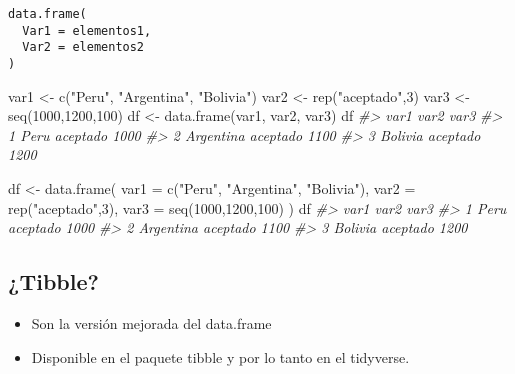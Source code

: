 \documentclass[
]{book}
\newenvironment{Shaded}{\begin{snugshade}}{\end{snugshade}}
\newcommand{\AttributeTok}[1]{\textcolor[rgb]{0.77,0.63,0.00}{#1}}
\newcommand{\CommentTok}[1]{\textcolor[rgb]{0.56,0.35,0.01}{\textit{#1}}}
\newcommand{\DecValTok}[1]{\textcolor[rgb]{0.00,0.00,0.81}{#1}}
\newcommand{\FunctionTok}[1]{\textcolor[rgb]{0.00,0.00,0.00}{#1}}
\newcommand{\NormalTok}[1]{#1}
\newcommand{\OtherTok}[1]{\textcolor[rgb]{0.56,0.35,0.01}{#1}}
\newcommand{\StringTok}[1]{\textcolor[rgb]{0.31,0.60,0.02}{#1}}
\providecommand{\tightlist}{%
  \setlength{\itemsep}{0pt}\setlength{\parskip}{0pt}}
\begin{document}
\begin{verbatim}
data.frame(
  Var1 = elementos1,
  Var2 = elementos2
)
\end{verbatim}

\begin{Shaded}
\begin{Highlighting}[]
\NormalTok{var1 }\OtherTok{\textless{}{-}} \FunctionTok{c}\NormalTok{(}\StringTok{"Peru"}\NormalTok{, }\StringTok{"Argentina"}\NormalTok{, }\StringTok{"Bolivia"}\NormalTok{)}
\NormalTok{var2 }\OtherTok{\textless{}{-}} \FunctionTok{rep}\NormalTok{(}\StringTok{"aceptado"}\NormalTok{,}\DecValTok{3}\NormalTok{)}
\NormalTok{var3 }\OtherTok{\textless{}{-}} \FunctionTok{seq}\NormalTok{(}\DecValTok{1000}\NormalTok{,}\DecValTok{1200}\NormalTok{,}\DecValTok{100}\NormalTok{)}
\NormalTok{df }\OtherTok{\textless{}{-}} \FunctionTok{data.frame}\NormalTok{(var1, var2, var3)}
\NormalTok{df}
\CommentTok{\#\textgreater{}        var1     var2 var3}
\CommentTok{\#\textgreater{} 1      Peru aceptado 1000}
\CommentTok{\#\textgreater{} 2 Argentina aceptado 1100}
\CommentTok{\#\textgreater{} 3   Bolivia aceptado 1200}
\end{Highlighting}
\end{Shaded}

\begin{Shaded}
\begin{Highlighting}[]
\NormalTok{df }\OtherTok{\textless{}{-}} \FunctionTok{data.frame}\NormalTok{(}
  \AttributeTok{var1 =} \FunctionTok{c}\NormalTok{(}\StringTok{"Peru"}\NormalTok{, }\StringTok{"Argentina"}\NormalTok{, }\StringTok{"Bolivia"}\NormalTok{),}
  \AttributeTok{var2 =} \FunctionTok{rep}\NormalTok{(}\StringTok{"aceptado"}\NormalTok{,}\DecValTok{3}\NormalTok{),}
  \AttributeTok{var3 =} \FunctionTok{seq}\NormalTok{(}\DecValTok{1000}\NormalTok{,}\DecValTok{1200}\NormalTok{,}\DecValTok{100}\NormalTok{)}
\NormalTok{)}
\NormalTok{df}
\CommentTok{\#\textgreater{}        var1     var2 var3}
\CommentTok{\#\textgreater{} 1      Peru aceptado 1000}
\CommentTok{\#\textgreater{} 2 Argentina aceptado 1100}
\CommentTok{\#\textgreater{} 3   Bolivia aceptado 1200}
\end{Highlighting}
\end{Shaded}

\hypertarget{tibble}{%
\subsection{¿Tibble?}\label{tibble}}

\begin{itemize}
\tightlist
\item
  Son la versión mejorada del data.frame
\item
  Disponible en el paquete tibble y por lo tanto en el tidyverse.
\end{itemize}
\end{document}
